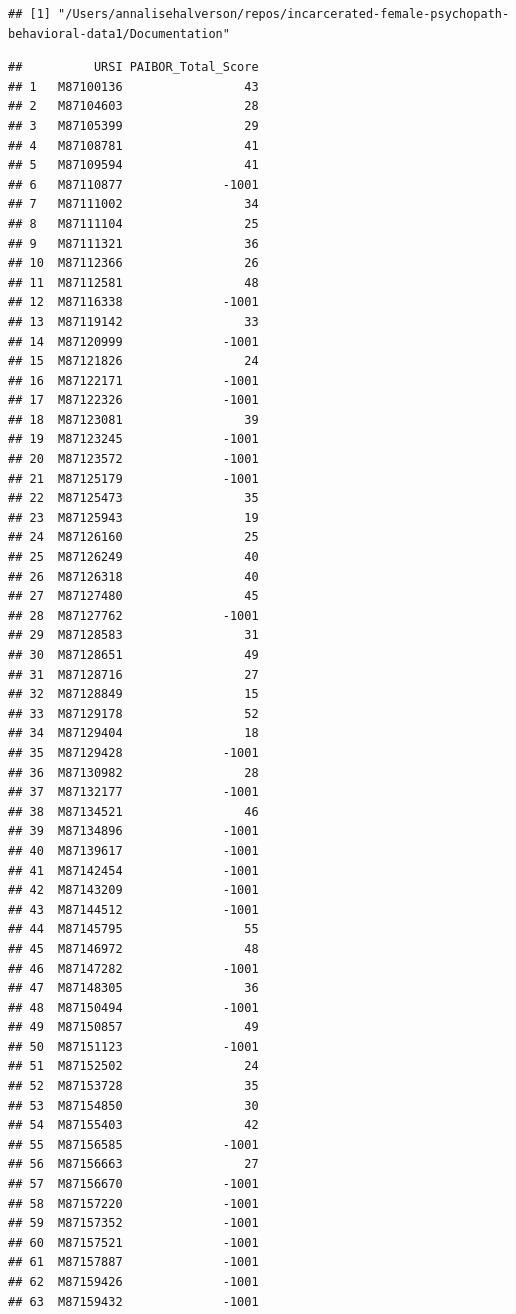 \documentclass[
  man]{apa6}
\begin{document}
\begin{verbatim}
## [1] "/Users/annalisehalverson/repos/incarcerated-female-psychopath-behavioral-data1/Documentation"
\end{verbatim}

\begin{verbatim}
##          URSI PAIBOR_Total_Score
## 1   M87100136                 43
## 2   M87104603                 28
## 3   M87105399                 29
## 4   M87108781                 41
## 5   M87109594                 41
## 6   M87110877              -1001
## 7   M87111002                 34
## 8   M87111104                 25
## 9   M87111321                 36
## 10  M87112366                 26
## 11  M87112581                 48
## 12  M87116338              -1001
## 13  M87119142                 33
## 14  M87120999              -1001
## 15  M87121826                 24
## 16  M87122171              -1001
## 17  M87122326              -1001
## 18  M87123081                 39
## 19  M87123245              -1001
## 20  M87123572              -1001
## 21  M87125179              -1001
## 22  M87125473                 35
## 23  M87125943                 19
## 24  M87126160                 25
## 25  M87126249                 40
## 26  M87126318                 40
## 27  M87127480                 45
## 28  M87127762              -1001
## 29  M87128583                 31
## 30  M87128651                 49
## 31  M87128716                 27
## 32  M87128849                 15
## 33  M87129178                 52
## 34  M87129404                 18
## 35  M87129428              -1001
## 36  M87130982                 28
## 37  M87132177              -1001
## 38  M87134521                 46
## 39  M87134896              -1001
## 40  M87139617              -1001
## 41  M87142454              -1001
## 42  M87143209              -1001
## 43  M87144512              -1001
## 44  M87145795                 55
## 45  M87146972                 48
## 46  M87147282              -1001
## 47  M87148305                 36
## 48  M87150494              -1001
## 49  M87150857                 49
## 50  M87151123              -1001
## 51  M87152502                 24
## 52  M87153728                 35
## 53  M87154850                 30
## 54  M87155403                 42
## 55  M87156585              -1001
## 56  M87156663                 27
## 57  M87156670              -1001
## 58  M87157220              -1001
## 59  M87157352              -1001
## 60  M87157521              -1001
## 61  M87157887              -1001
## 62  M87159426              -1001
## 63  M87159432              -1001

\end{verbatim}
\end{document}
